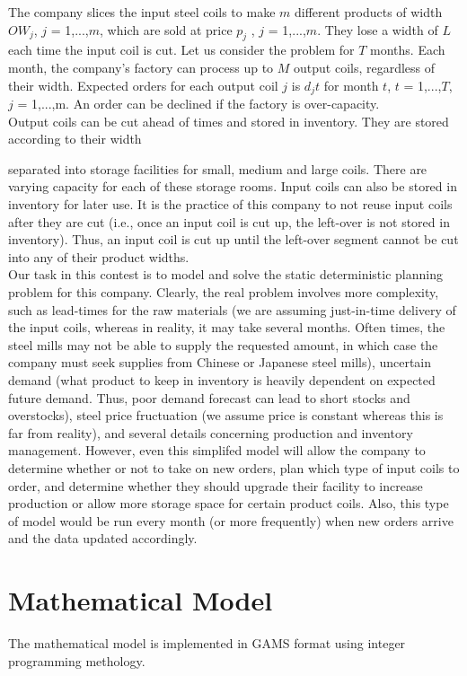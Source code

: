 \documentclass{article}[12pt]
\begin{document}
The company slices the input steel coils to make $m$ different products of width $OW_j$, $j$ = 1,...,$m$,
which are sold at price $p_j$ , $j$ = 1,...,$m$. They lose a width of $L$ each time the input coil is cut.
Let us consider the problem for $T$ months. Each month, the company's factory can process up to
$M$ output coils, regardless of their width. Expected orders for each output coil $j$ is $d_jt$ for month $t$,
$t$ = 1,...,$T$, $j$ = 1,...,m. An order can be declined if the factory is over-capacity.\\

Output coils can be cut ahead of times and stored in inventory. They are stored according to their
width { separated into storage facilities for small, medium and large coils. There are varying capacity
for each of these storage rooms. Input coils can also be stored in inventory for later use. It is the
practice of this company to not reuse input coils after they are cut (i.e., once an input coil is cut up,
the left-over is not stored in inventory). Thus, an input coil is cut up until the left-over segment cannot
be cut into any of their product widths.\\

Our task in this contest is to model and solve the static deterministic planning problem for this
company. Clearly, the real problem involves more complexity, such as lead-times for the raw materials
(we are assuming just-in-time delivery of the input coils, whereas in reality, it may take several months.
Often times, the steel mills may not be able to supply the requested amount, in which case the company
must seek supplies from Chinese or Japanese steel mills), uncertain demand (what product to keep in
inventory is heavily dependent on expected future demand. Thus, poor demand forecast can lead to
short stocks and overstocks), steel price fructuation (we assume price is constant whereas this is far
from reality), and several details concerning production and inventory management. However, even
this simplifed model will allow the company to determine whether or not to take on new orders, plan
which type of input coils to order, and determine whether they should upgrade their facility to increase
production or allow more storage space for certain product coils. Also, this type of model would be run
every month (or more frequently) when new orders arrive and the data updated accordingly.\\

\section{Mathematical Model} 
The mathematical model is implemented in GAMS format using integer programming methology.\\ 

}
\end{document}

